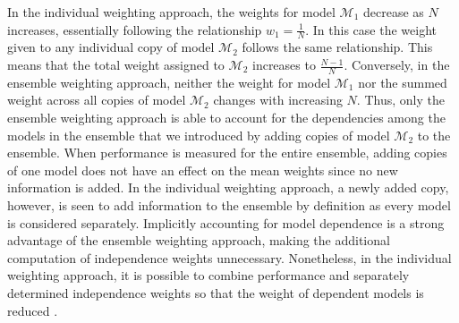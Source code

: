 In the individual weighting approach, the weights for model $\mathcal{M}_1$ decrease as $N$ increases, essentially following the relationship $w_1=\frac{1}{N}$.
In this case the weight given to any individual copy of model $\mathcal{M}_2$ follows the same relationship. This means that the total weight assigned to  $\mathcal{M}_2$ increases to $\frac{N-1}{N}$.
Conversely, in the ensemble weighting approach, neither the weight for model $\mathcal{M}_1$ nor the summed weight across all copies of model $\mathcal{M}_2$ changes with increasing $N$.
Thus, only the ensemble weighting approach is able to account for the dependencies among the models in the ensemble that we introduced by adding copies of model $\mathcal{M}_2$ to the ensemble.
When performance is measured for the entire ensemble, adding copies of one model does not have an effect on the mean weights since no new information is added. In the individual weighting approach, a newly added copy, however, is seen to add information to the ensemble by definition as every model is considered separately.
Implicitly accounting for model dependence is a strong advantage of the ensemble weighting approach, making the additional computation of independence weights unnecessary.
Nonetheless, in the individual weighting approach, it is possible to combine performance and separately determined independence weights so that the weight of dependent models is reduced \citep[e.g.~see tests from][]{brunnerReducedGlobalWarming2020}.

